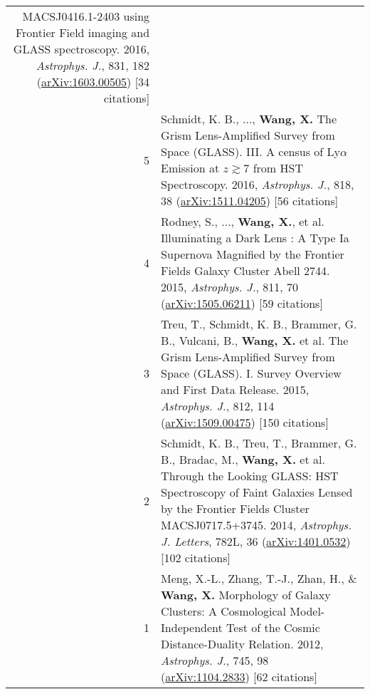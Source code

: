 \documentclass[letterpaper,12pt]{article}
\begin{document}
\begin{longtable}{rp{5.8in}}
    MACSJ0416.1-2403 using Frontier Field imaging and GLASS spectroscopy. 2016, \textit{Astrophys. J.}, 831, 182 (\href{https://arxiv.org/abs/1603.00505}
    {arXiv:1603.00505}) [34 citations]   \\
5   &   Schmidt, K. B., ..., \textbf{Wang, X.} The Grism Lens-Amplified Survey from Space (GLASS). III. A census of Ly$\alpha$ Emission at $z\gtrsim$7 
    from HST Spectroscopy. 2016, \textit{Astrophys. J.}, 818, 38 (\href{https://arxiv.org/abs/1511.04205}{arXiv:1511.04205}) [56 citations] \\
4   &   Rodney, S., ..., \textbf{Wang, X.}, et al. Illuminating a Dark Lens : A Type Ia Supernova Magnified by the Frontier Fields Galaxy Cluster 
    Abell 2744. 2015, \textit{Astrophys. J.}, 811, 70 (\href{https://arxiv.org/abs/1505.06211}{arXiv:1505.06211}) [59 citations]  \\
3   &   Treu, T., Schmidt, K. B., Brammer, G. B., Vulcani, B., \textbf{Wang, X.} et al. The Grism Lens-Amplified Survey from Space (GLASS). I. Survey 
    Overview and First Data Release. 2015, \textit{Astrophys. J.}, 812, 114 
    (\href{https://arxiv.org/abs/1509.00475}{arXiv:1509.00475}) [150 citations]  \\
2   &   Schmidt, K. B., Treu, T., Brammer, G. B., Bradac, M., \textbf{Wang, X.} et al. Through the Looking GLASS: HST Spectroscopy of Faint Galaxies 
    Lensed by the Frontier Fields Cluster MACSJ0717.5+3745. 2014, \textit{Astrophys. J. Letters}, 782L, 36 (\href{http://arxiv.org/abs/1401.0532}{arXiv:1401.0532}) [102 citations] \\
1   &   Meng, X.-L., Zhang, T.-J., Zhan, H., \& \textbf{Wang, X.} Morphology of Galaxy Clusters: A Cosmological Model-Independent Test of the Cosmic 
    Distance-Duality Relation. 2012, \textit{Astrophys. J.}, 745, 98 (\href{http://arxiv.org/abs/1104.2833}{arXiv:1104.2833}) [62 citations]

\end{longtable}
\endgroup
\end{document}
